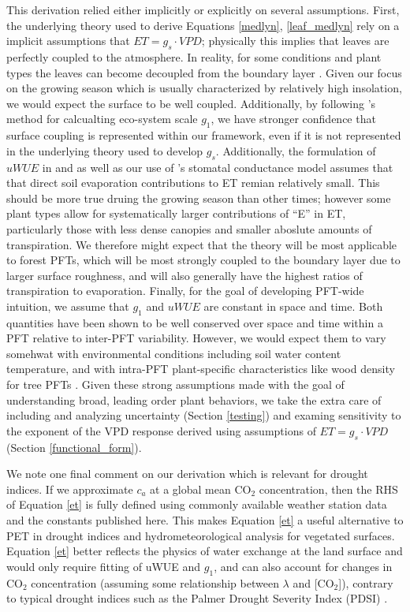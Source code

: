 \documentclass[draft,linenumbers]{agujournal}
\begin{document}
This derivation relied either implicitly or explicitly on several
assumptions. First, the underlying theory used to derive Equations
\ref{medlyn}, \ref{leaf_medlyn} rely on a implicit assumptions that
$ET=g_s \cdot VPD$; physically this implies that leaves are perfectly
coupled to the atmosphere. In reality, for some conditions and plant
types the leaves can become decoupled from the boundary layer
\citep{De_2017, Medlyn_2017}. Given our focus on the growing season
which is usually characterized by relatively high insolation, we would
expect the surface to be well coupled. Additionally, by following
\citet{Medlyn_2017}'s method for calcualting eco-system scale $g_1$,
we have stronger confidence that surface coupling is represented
within our framework, even if it is not represented in the underlying
theory used to develop $g_s$. Additionally, the formulation of $uWUE$
in \citet{Zhou_2014} and \citet{Zhou_2015} as well as our use of
\citet{Medlyn_2017}'s stomatal conductance model assumes that that
direct soil evaporation contributions to ET remian relatively
small. This should be more true druing the growing season than other
times; however some plant types allow for systematically larger
contributions of ``E'' in ET, particularly those with less dense
canopies and smaller aboslute amounts of transpiration. We therefore
might expect that the theory will be most applicable to forest PFTs,
which will be most strongly coupled to the boundary layer due to
larger surface roughness, and will also generally have the highest
ratios of transpiration to evaporation. Finally, for the goal of
developing PFT-wide intuition, we assume that $g_1$ and $uWUE$ are
constant in space and time. Both quantities have been shown to be well
conserved over space and time within a PFT relative to inter-PFT
variability. However, we would expect them to vary somehwat with
environmental conditions including soil water content temperature, and
with intra-PFT plant-specific characteristics like wood density for
tree PFTs \citep{Lin_2015}. Given these strong assumptions made with
the goal of understanding broad, leading order plant behaviors, we
take the extra care of including and analyzing uncertainty (Section
\ref{testing}) and examing sensitivity to the exponent of the VPD
response derived using assumptions of $ET=g_s \cdot VPD$ (Section
\ref{functional_form}).

We note one final comment on our derivation which is relevant for
drought indices. If we approximate $c_a$ at a global mean CO$_2$
concentration, then the RHS of Equation \ref{et} is fully defined
using commonly available weather station data and the constants
published here. This makes Equation \ref{et} a useful alternative to
PET in drought indices and hydrometeorological analysis for vegetated
surfaces. Equation \ref{et} better reflects the physics of water
exchange at the land surface and would only require fitting of uWUE
and $g_1$, and can also account for changes in CO$_2$ concentration
(assuming some relationship between $\lambda$ and [CO$_2$]), contrary
to typical drought indices such as the Palmer Drought Severity Index
(PDSI) \citep{Swann_2016}.
\end{document}
